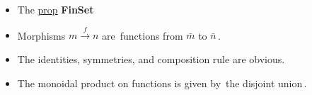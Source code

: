 \begin{itemize}
    \item The \href{doc/1 math/Seven Sketches in Compositionality/Chapter 5: Signal flow graphs/2 Props and presentations/1 Props - definition and first examples/1 Prop}{prop} \textbf{FinSet}
    \item Morphisms $m \xrightarrow f n$ are \,functions from $\bar m$ to $\bar n$\,.
    \item The identities, symmetries, and composition rule are obvious.
    \item The monoidal product on functions is given by \,the disjoint union\,.
  \end{itemize}